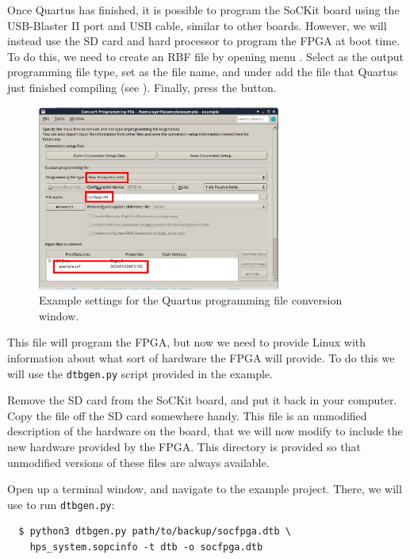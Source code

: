 \documentclass{sockitguide}
\begin{document}
Once Quartus has finished, it is possible to program the SoCKit board
using the USB-Blaster II port and USB cable, similar to other
boards. However, we will instead use the SD card and hard processor to
program the FPGA at boot time. To do this, we need to create an RBF
file by opening menu . Select  as the output
programming file type, set  as the file name,
and under  add the
 file that Quartus just finished compiling (see
). Finally, press the  button.

\begin{figure}
  \includegraphics[width=8cm]{figures/rbf.png}
  \caption{Example settings for the Quartus programming file conversion window.}
  \label{fig:rbf}
\end{figure}

This file will program the FPGA, but now we need to provide Linux with
information about what sort of hardware the FPGA will provide. To do
this we will use the \texttt{dtbgen.py} script provided in the
example.

Remove the SD card from the SoCKit board, and put it back in your
computer. Copy the  file off the SD card
somewhere handy. This file is an unmodified description of the
hardware on the board, that we will now modify to include the new
hardware provided by the FPGA. This  directory is
provided so that unmodified versions of these files are always
available.

Open up a terminal window, and navigate to the example project. There,
we will use  to run
\texttt{dtbgen.py}:
\begin{verbatim}
  $ python3 dtbgen.py path/to/backup/socfpga.dtb \
    hps_system.sopcinfo -t dtb -o socfpga.dtb
\end{verbatim}
\end{document}

